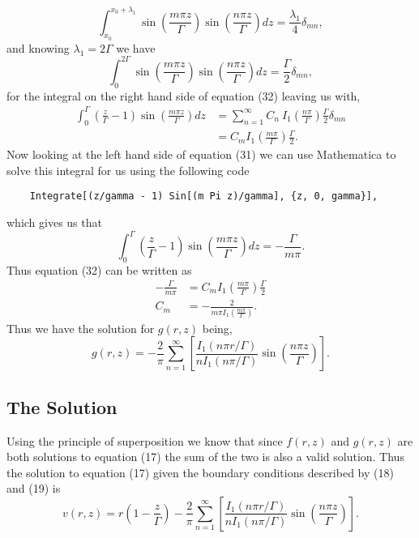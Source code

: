 \documentclass[11pt,letterpaper]{article}
\newcommand{\fpar}[1]{\left({#1}\right)} %
\newcommand{\fbrac}[1]{\left[{#1}\right]} %
\begin{document}
\begin{equation}
    \int_{x_0}^{x_0+\lambda_1}\sin\fpar{\frac{m\pi z}{\Gamma}}\sin\fpar{\frac{n\pi z}{\Gamma}}dz = \frac{\lambda_1}{4}\delta_{mn},
\end{equation}
and knowing $\lambda_1 = 2\Gamma$ we have 
\begin{equation}
    \int_{0}^{2\Gamma}\sin\fpar{\frac{m\pi z}{\Gamma}}\sin\fpar{\frac{n\pi z}{\Gamma}}dz = \frac{\Gamma}{2}\delta_{mn},
\end{equation}
for the integral on the right hand side of equation (32) leaving us with,
\begin{align*}
        \int_{0}^{\Gamma}{\fpar{\frac{z}{\Gamma} -1}\sin\fpar{\frac{m\pi z}{\Gamma}}}dz &= \sum_{n=1}^\infty C_n\ I_1\fpar{\frac{n\pi}{\Gamma}} \frac{\Gamma}{2}\delta_{mn}\\
        &=C_m I_1\fpar{\frac{m\pi}{\Gamma}}\frac{\Gamma}{2}.
\end{align*}
Now looking at the left hand side of equation (31) we can use Mathematica to solve this integral for us using the following code
\begin{verbatim}
    Integrate[(z/gamma - 1) Sin[(m Pi z)/gamma], {z, 0, gamma}],
\end{verbatim}
which gives us that
\begin{equation*}
     \int_{0}^{\Gamma}{\fpar{\frac{z}{\Gamma} -1}\sin\fpar{\frac{m\pi z}{\Gamma}}}dz = -\frac{\Gamma}{m\pi}.
\end{equation*}
Thus equation (32) can be written as 
\begin{align*}
    -\frac{\Gamma}{m\pi} &= C_m I_1\fpar{\frac{m\pi}{\Gamma}}\frac{\Gamma}{2}\\
    C_m &= -\frac{2}{m\pi I_1\fpar{\frac{m\pi}{\Gamma}}}.
\end{align*}
Thus we have the solution for $g(r,z)$ being,
\begin{equation}
    g(r,z) =  - \dfrac{2}{\pi}\sum_{n=1}^\infty\fbrac{\dfrac{I_1\fpar{{n\pi r}/{\Gamma}}}{nI_1\fpar{{n\pi }/\Gamma}}\sin\fpar{\frac{n\pi z}{\Gamma}}}.
\end{equation}
\subsection{The Solution}
Using the principle of superposition we know that since $f(r,z)$ and $g(r,z)$ are both solutions to equation (17) the sum of the two is also a valid solution. Thus the solution to equation (17) given the boundary conditions described by (18) and (19) is 
\begin{equation}\label{eq:Exact_SS_Soln}
    v(r,z) = r\fpar{1-\dfrac{z}{\Gamma}} - \dfrac{2}{\pi}\sum_{n=1}^\infty\fbrac{\dfrac{I_1\fpar{{n\pi r}/{\Gamma}}}{nI_1\fpar{{n\pi }/\Gamma}}\sin\fpar{\frac{n\pi z}{\Gamma}}}.
\end{equation}
\end{document}
